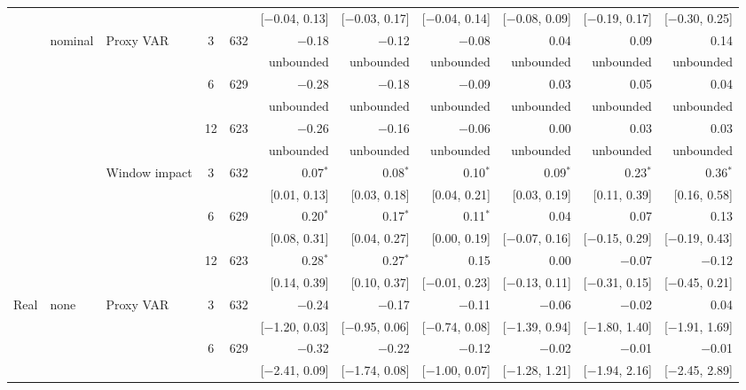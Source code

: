 \begin{longtable}{lllcrrrrrrr}
 & & & & & {\tiny [$-$0.04, 0.13]} & {\tiny [$-$0.03, 0.17]} & {\tiny [$-$0.04, 0.14]} & {\tiny [$-$0.08, 0.09]} & {\tiny [$-$0.19, 0.17]} & {\tiny [$-$0.30, 0.25]}\\
 & nominal & Proxy VAR & 3 & 632 & $-$0.18 & $-$0.12 & $-$0.08 & 0.04 & 0.09 & 0.14\\
 & & & & & {\tiny unbounded} & {\tiny unbounded} & {\tiny unbounded} & {\tiny unbounded} & {\tiny unbounded} & {\tiny unbounded}\\
 &  &  & 6 & 629 & $-$0.28 & $-$0.18 & $-$0.09 & 0.03 & 0.05 & 0.04\\
 & & & & & {\tiny unbounded} & {\tiny unbounded} & {\tiny unbounded} & {\tiny unbounded} & {\tiny unbounded} & {\tiny unbounded}\\
 &  &  & 12 & 623 & $-$0.26 & $-$0.16 & $-$0.06 & 0.00 & 0.03 & 0.03\\
 & & & & & {\tiny unbounded} & {\tiny unbounded} & {\tiny unbounded} & {\tiny unbounded} & {\tiny unbounded} & {\tiny unbounded}\\
 &  & Window impact & 3 & 632 & 0.07$^{*}$ & 0.08$^{*}$ & 0.10$^{*}$ & 0.09$^{*}$ & 0.23$^{*}$ & 0.36$^{*}$\\
 & & & & & {\tiny [0.01, 0.13]} & {\tiny [0.03, 0.18]} & {\tiny [0.04, 0.21]} & {\tiny [0.03, 0.19]} & {\tiny [0.11, 0.39]} & {\tiny [0.16, 0.58]}\\
 &  &  & 6 & 629 & 0.20$^{*}$ & 0.17$^{*}$ & 0.11$^{*}$ & 0.04 & 0.07 & 0.13\\
 & & & & & {\tiny [0.08, 0.31]} & {\tiny [0.04, 0.27]} & {\tiny [0.00, 0.19]} & {\tiny [$-$0.07, 0.16]} & {\tiny [$-$0.15, 0.29]} & {\tiny [$-$0.19, 0.43]}\\
 &  &  & 12 & 623 & 0.28$^{*}$ & 0.27$^{*}$ & 0.15 & 0.00 & $-$0.07 & $-$0.12\\
 & & & & & {\tiny [0.14, 0.39]} & {\tiny [0.10, 0.37]} & {\tiny [$-$0.01, 0.23]} & {\tiny [$-$0.13, 0.11]} & {\tiny [$-$0.31, 0.15]} & {\tiny [$-$0.45, 0.21]}\\
\addlinespace
Real & none & Proxy VAR & 3 & 632 & $-$0.24 & $-$0.17 & $-$0.11 & $-$0.06 & $-$0.02 & 0.04\\
 & & & & & {\tiny [$-$1.20, 0.03]} & {\tiny [$-$0.95, 0.06]} & {\tiny [$-$0.74, 0.08]} & {\tiny [$-$1.39, 0.94]} & {\tiny [$-$1.80, 1.40]} & {\tiny [$-$1.91, 1.69]}\\
 &  &  & 6 & 629 & $-$0.32 & $-$0.22 & $-$0.12 & $-$0.02 & $-$0.01 & $-$0.01\\
 & & & & & {\tiny [$-$2.41, 0.09]} & {\tiny [$-$1.74, 0.08]} & {\tiny [$-$1.00, 0.07]} & {\tiny [$-$1.28, 1.21]} & {\tiny [$-$1.94, 2.16]} & {\tiny [$-$2.45, 2.89]}\\

\end{longtable}

